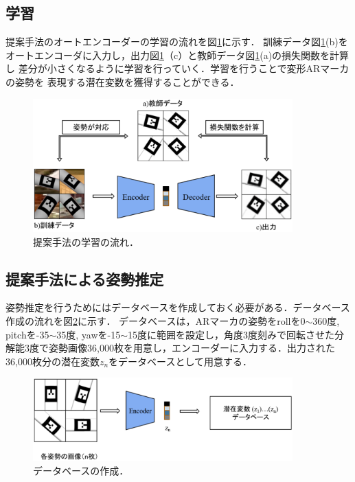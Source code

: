\subsection{学習}
提案手法のオートエンコーダーの学習の流れを図\ref{gakusyu}に示す．
訓練データ図\ref{gakusyu}(b)をオートエンコーダに入力し，出力図\ref{gakusyu}（c）と教師データ図\ref{gakusyu}(a)の損失関数を計算し
差分が小さくなるように学習を行っていく．学習を行うことで変形ARマーカの姿勢を
表現する潜在変数を獲得することができる．
      \begin{figure}[htbp]
      \begin{center}
      \includegraphics[width=100mm]{figure/eps/提案手法の学習.eps}
      \caption{提案手法の学習の流れ．}
      \label{gakusyu}
      \end{center}
      \end{figure}


\subsection{提案手法による姿勢推定}
姿勢推定を行うためにはデータベースを作成しておく必要がある．データベース作成の流れを図\ref{データベース}に示す．
データベースは，ARマーカの姿勢をrollを0$\sim$360度, pitchを-35$\sim$35度, yawを-15$\sim$15度に範囲を設定し，角度3度刻みで回転させた分解能3度で姿勢画像36,000枚を用意し，エンコーダーに入力する．出力された36,000枚分の潜在変数$z_n$をデータベースとして用意する．

      \begin{figure}[htbp]
      \begin{center}
      \includegraphics[width=100mm]{figure/eps/データベース.eps}
      \caption{データベースの作成．}
      \label{データベース}
      \end{center}
      \end{figure}

